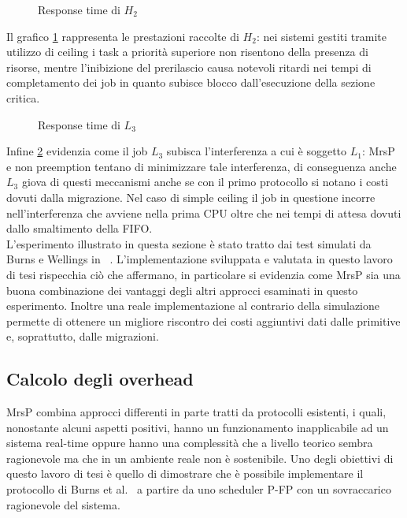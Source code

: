 {\begin{figure}
  \centering
  \confrontoProtocolliHDue
  \caption{Response time di $H_2$}
  \label{fig:test_protocols_H2}
\end{figure}

\noindent Il grafico \ref{fig:test_protocols_H2} rappresenta le prestazioni raccolte di $H_2$: nei sistemi gestiti tramite utilizzo di ceiling i task a priorità superiore non risentono della presenza di risorse, mentre l'inibizione del prerilascio causa notevoli ritardi nei tempi di completamento dei job in quanto subisce blocco dall'esecuzione della sezione critica.\\

\begin{figure}
  \centering
  \confrontoProtocolliLTre
  \caption{Response time di $L_3$}
  \label{fig:test_protocols_L3}
\end{figure}

\noindent Infine \ref{fig:test_protocols_L3} evidenzia come il job $L_3$ subisca l'interferenza a cui è soggetto $L_1$: MrsP e non preemption tentano di minimizzare tale interferenza, di conseguenza anche $L_3$ giova di questi meccanismi anche se con il primo protocollo si notano i costi dovuti dalla migrazione. Nel caso di simple ceiling il job in questione incorre nell'interferenza che avviene nella prima CPU oltre che nei tempi di attesa dovuti dallo smaltimento della FIFO.\\

\noindent L'esperimento illustrato in questa sezione è stato tratto dai test simulati da Burns e Wellings in ~\cite{Burns:2013:SCM:2547348.2547350}. L'implementazione sviluppata e valutata in questo lavoro di tesi rispecchia ciò che affermano, in particolare si evidenzia come MrsP sia una buona combinazione dei vantaggi degli altri approcci esaminati in questo esperimento. Inoltre una reale implementazione al contrario della simulazione permette di ottenere un migliore riscontro dei costi aggiuntivi dati dalle primitive e, soprattutto, dalle migrazioni.\\

\newpage

\subsection{Calcolo degli overhead}
\label{sec:overhead}

\noindent MrsP combina approcci differenti in parte tratti da protocolli esistenti, i quali, nonostante alcuni aspetti positivi, hanno un funzionamento inapplicabile ad un sistema real-time oppure hanno una complessità che a livello teorico sembra ragionevole ma che in un ambiente reale non è sostenibile. Uno degli obiettivi di questo lavoro di tesi è quello di dimostrare che è possibile implementare il protocollo di Burns et al.~\cite{Burns:2013:SCM:2547348.2547350} a partire da uno scheduler P-FP con un sovraccarico ragionevole del sistema.

}
